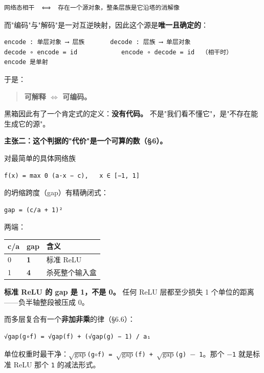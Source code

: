 \documentclass[11pt,a4paper]{ctexart}
\begin{document}
\begin{lstlisting}
网络态相干  ⟺  存在一个源对象，整条层族是它沿塔的消解像
\end{lstlisting}

而"编码"与"解码"是一对互逆映射，因此这个源是\textbf{唯一且确定的}：

\begin{lstlisting}
encode : 单层对象 ⟶ 层族       decode : 层族 ⟶ 单层对象
decode ∘ encode = id            encode ∘ decode = id  （相干时）
encode 是单射
\end{lstlisting}

于是：

\begin{quote}
\textbf{可解释 \ensuremath{\Longleftrightarrow} 可编码。}
\end{quote}

黑箱因此有了一个肯定式的定义：\textbf{没有代码。} 不是"我们看不懂它"，是"不存在能生成它的源"。

\textbf{主张二：这个判据的"代价"是一个可算的数（§6）。}

对最简单的具体网络族

\begin{lstlisting}
f(x) = max 0 (a·x − c),   x ∈ [−1, 1]
\end{lstlisting}

的坍缩跨度（gap）有精确闭式：

\begin{lstlisting}
gap = (c/a + 1)²
\end{lstlisting}

两端：

\begin{center}\small
\begin{tabular}{lll}
\toprule
c/a & gap & 含义 \\
\midrule
0 & \textbf{1} & 标准 ReLU \\
1 & \textbf{4} & 杀死整个输入盒 \\
\bottomrule
\end{tabular}
\end{center}

\textbf{标准 ReLU 的 gap 是 1，不是 0。} 任何 ReLU 层都至少损失 1 个单位的距离——负半轴整段被压成 0。

而多层复合有一个\textbf{非加非乘}的律（§6.6）：

\begin{lstlisting}
√gap(g∘f) = √gap(f) + (√gap(g) − 1) / a₁
\end{lstlisting}

单位权重时最干净：\texttt{\ensuremath{\sqrt{\mathrm{gap}}}(g\ensuremath{\circ}f) = \ensuremath{\sqrt{\mathrm{gap}}}(f) + \ensuremath{\sqrt{\mathrm{gap}}}(g) \ensuremath{-} 1}。那个 \texttt{\ensuremath{-}1} 就是标准 ReLU 那个 \texttt{1} 的减法形式。
\end{document}
